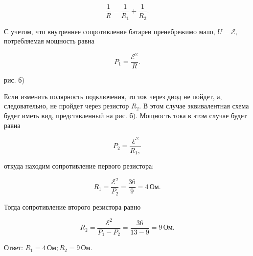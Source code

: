 \documentclass[12pt,a4paper]{article}
\begin{document}
{\[\frac{1}{R} = \frac{1}{R_1} + \frac{1}{R_2} .\]

С учетом, что внутреннее сопротивление батареи пренебрежимо мало, $U= \mathcal{E} ,$ потребляемая мощность равна

\[P_1= \frac{\mathcal{E} ^2}{R} .\]



\begin{center}\end{center}

 рис. б) 

 Если изменить полярность подключения, то ток через диод не пойдет, а, следовательно, не пройдет через резистор $R_{2}$. В этом случае эквивалентная схема будет иметь вид, представленный на рис. б). Мощность тока в этом случае будет равна

\[P_2= \frac{\mathcal{E} ^2}{R_1,}\]

откуда находим сопротивление первого резистора:

\[R_1= \frac{\mathcal{E} ^2}{P_2} = \frac{36}{9} =4\,\text{Ом}.\]

Тогда сопротивление второго резистора равно

\[R_2= \frac{\mathcal{E} ^2}{P_1 - P_2} = \frac{36}{13 - 9} =9\,\text{Ом}.\]

Ответ: $R_1=4\,\text{Ом}; R_2=9\,\text{Ом}.$
}
\end{document}
